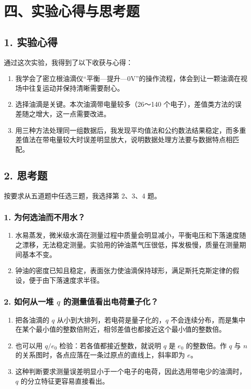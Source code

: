 \clearpage
\section*{四、实验心得与思考题}

\subsection*{1. 实验心得}

通过这次实验，我得到了以下收获与心得：

\begin{enumerate}
\item 我学会了密立根油滴仪“平衡—提升—0V”的操作流程，体会到让一颗油滴在视场中往复运动并保持清晰需要耐心。
\item 选择油滴是关键。本次油滴带电量较多（26～140 个电子），差值类方法的误差随之增大，这一点需要改进。
\item 用三种方法处理同一组数据后，我发现平均值法和公约数法结果稳定，而多重差值法在带电量较大时误差明显放大，说明数据处理方法要与数据特点相匹配。

\end{enumerate}
\subsection*{2. 思考题}

按要求从五道题中任选三题，我选择第 2、3、4 题。

\subsubsection*{1. 为何选油而不用水？}

\begin{enumerate}[leftmargin=3.6em]
\item 水易蒸发，微米级水滴在测量过程中质量会明显减小，平衡电压和下落速度随之漂移，无法稳定测量。实验用的钟油蒸气压很低，挥发极慢，质量在测量期间基本不变。
\item 钟油的密度已知且稳定，表面张力使油滴保持球形，满足斯托克斯定律的假设，便于由下落速度求半径。

\end{enumerate}
\subsubsection*{2. 如何从一堆 $q$ 的测量值看出电荷量子化？}

\begin{enumerate}[leftmargin=3.6em]
\item 把各油滴的 $q$ 从小到大排列，若电荷是量子化的，$q$ 不会连续分布，而是集中在某个最小值的整数倍附近，相邻差值也都接近这个最小值的整数倍。
\item 也可以用 $q/e_0$ 检验：若各值都接近整数，就说明 $q$ 是 $e_0$ 的整数倍。作 $q$ 与 $n$ 的关系图时，各点应落在一条过原点的直线上，斜率即为 $e$。
\item 这种判断要求测量误差明显小于一个电子的电荷，因此选用带电少的油滴时，$q$ 的分立特征更容易直接看出。

\end{enumerate}
